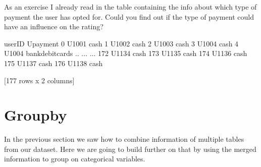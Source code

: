 \documentclass[letterpaper,10pt,english]{jupyterBook}
\begin{document}
\sphinxAtStartPar
As an exercise I already read in the table containing the info about which type of payment the user has opted for.
Could you find out if the type of payment could have an influence on the rating?

\begin{sphinxVerbatim}[commandchars=\\\{\}]
  
\end{sphinxVerbatim}

\begin{sphinxVerbatim}[commandchars=\\\{\}]
    userID          Upayment
0    U1001              cash
1    U1002              cash
2    U1003              cash
3    U1004              cash
4    U1004  bank\PYGZus{}debit\PYGZus{}cards
..     ...               ...
172  U1134              cash
173  U1135              cash
174  U1136              cash
175  U1137              cash
176  U1138              cash

[177 rows x 2 columns]
\end{sphinxVerbatim}


\chapter{Groupby}
\label{\detokenize{c3_data_preprocessing/groupby:groupby}}\label{\detokenize{c3_data_preprocessing/groupby::doc}}
\sphinxAtStartPar
In the previous section we saw how to combine information of multiple tables from our dataset.
Here we are going to build further on that by using the merged information to group on categorical variables.

\begin{sphinxVerbatim}[commandchars=\\\{\}]
   
\end{sphinxVerbatim}

\begin{sphinxVerbatim}[commandchars=\\\{\}]
  
\end{sphinxVerbatim}
\end{document}
